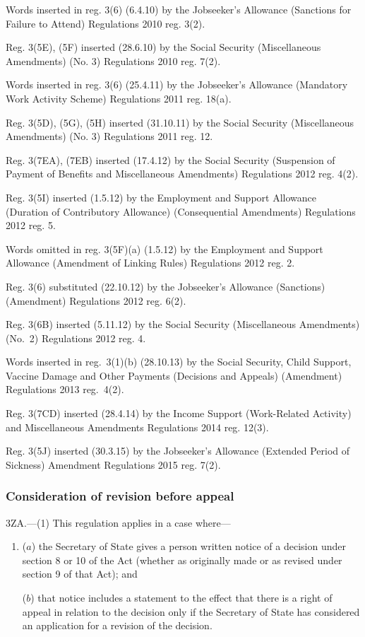 \documentclass[12pt,a4paper]{article}
\begin{document}
{Words inserted in reg. 3(6) (6.4.10) by the Jobseeker’s Allowance (Sanctions for Failure to Attend) Regulations 2010 reg. 3(2).

Reg. 3(5E), (5F) inserted (28.6.10) by the Social Security (Miscellaneous Amendments) (No. 3) Regulations 2010 reg. 7(2).

Words inserted in reg. 3(6) (25.4.11) by the Jobseeker’s Allowance (Mandatory Work Activity Scheme) Regulations 2011 reg. 18(a).

Reg. 3(5D), (5G), (5H) inserted (31.10.11) by the Social Security (Miscellaneous Amendments) (No. 3) Regulations 2011 reg. 12.

Reg. 3(7EA), (7EB) inserted (17.4.12) by the Social Security (Suspension of Payment of Benefits and Miscellaneous Amendments) Regulations 2012 reg. 4(2).

Reg. 3(5I) inserted (1.5.12) by the Employment and Support Allowance (Duration of Contributory Allowance) (Consequential Amendments) Regulations 2012 reg. 5.

Words omitted in reg. 3(5F)(a) (1.5.12) by the Employment and Support Allowance (Amendment of Linking Rules) Regulations 2012 reg. 2.

Reg. 3(6) substituted (22.10.12) by the Jobseeker’s Allowance (Sanctions) (Amendment) Regulations 2012 reg. 6(2).

Reg. 3(6B) inserted (5.11.12) by the Social Security (Miscellaneous Amendments) (No.~2) Regulations 2012 reg. 4.

Words inserted in reg.~3(1)(b) (28.10.13) by the Social Security, Child Support, Vaccine Damage and Other Payments (Decisions and Appeals) (Amendment) Regulations 2013 reg.~4(2).

Reg. 3(7CD) inserted (28.4.14) by the Income Support (Work-Related Activity) and Miscellaneous Amendments Regulations 2014 reg. 12(3).

Reg. 3(5J) inserted (30.3.15) by the Jobseeker’s Allowance (Extended Period of Sickness) Amendment Regulations 2015 reg. 7(2).
}

\subsubsection[3ZA. Consideration of revision before appeal]{Consideration of revision before appeal}

3ZA.---(1)  This regulation applies in a case where—
\begin{enumerate}\item[]
($a$) the Secretary of State gives a person written notice of a decision under section 8 or 10 of the Act (whether as originally made or as revised under section 9 of that Act); and

($b$) that notice includes a statement to the effect that there is a right of appeal in relation to the decision only if the Secretary of State has considered an application for a revision of the decision.
\end{enumerate}
\end{document}
